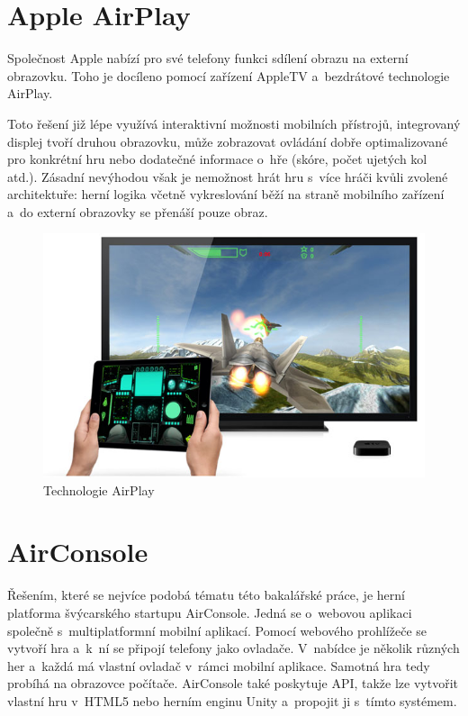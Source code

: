 \documentclass[thesis=B,czech,hidelinks]{FITthesis}[2012/06/26] %
\begin{document}
\section{Apple AirPlay}

Společnost Apple nabízí pro své telefony funkci sdílení obrazu na externí obrazovku. Toho je docíleno pomocí zařízení AppleTV a~bezdrátové technologie AirPlay\cite{airplay}.

Toto řešení již lépe využívá interaktivní možnosti mobilních přístrojů, integrovaný displej tvoří druhou obrazovku, může zobrazovat ovládání dobře optimalizované pro konkrétní hru nebo dodatečné informace o~hře (skóre, počet ujetých kol atd.). Zásadní nevýhodou však je nemožnost hrát hru s~více hráči kvůli zvolené architektuře: herní logika včetně vykreslování běží na straně mobilního zařízení a~do externí obrazovky se přenáší pouze obraz.

\begin{figure}[h]
\includegraphics[width=\textwidth]{airplay}
\caption{Technologie AirPlay\cite{airplay}}
\end{figure}


\section{AirConsole}

Řešením, které se nejvíce podobá tématu této bakalářské práce, je herní platforma švýcarského startupu AirConsole\cite{airconsole}. Jedná se o~webovou aplikaci společně s~multiplatformní mobilní aplikací. Pomocí webového prohlížeče se vytvoří hra a~k~ní se připojí telefony jako ovladače. V~nabídce je několik různých her a~každá má vlastní ovladač v~rámci mobilní aplikace. Samotná hra tedy probíhá na obrazovce počítače. AirConsole také poskytuje API, takže lze vytvořit vlastní hru v~HTML5 nebo herním enginu Unity a~propojit ji s~tímto systémem.
\end{document}
